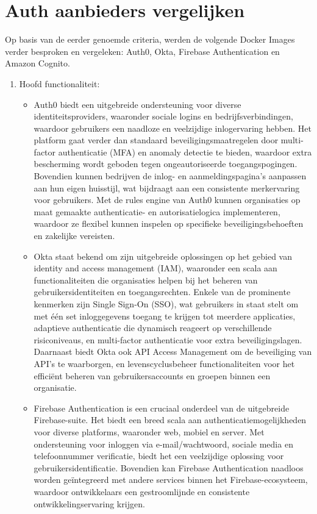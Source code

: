 \section{Auth aanbieders vergelijken}%
\label{sec:auth-aanbieders-vergelijken}
Op basis van de eerder genoemde criteria, werden de volgende Docker Images verder besproken en vergeleken: Auth0, Okta, Firebase Authentication en Amazon Cognito.
\begin{enumerate}
  \item Hoofd functionaliteit:
  \begin{itemize}
    \item Auth0 biedt een uitgebreide ondersteuning voor diverse identiteitsproviders, waaronder sociale logins en bedrijfsverbindingen, waardoor gebruikers een naadloze en veelzijdige inlogervaring hebben. Het platform gaat verder dan standaard beveiligingsmaatregelen door multi-factor authenticatie (MFA) en anomaly detectie te bieden, waardoor extra bescherming wordt geboden tegen ongeautoriseerde toegangspogingen. Bovendien kunnen bedrijven de inlog- en aanmeldingspagina's aanpassen aan hun eigen huisstijl, wat bijdraagt aan een consistente merkervaring voor gebruikers. Met de rules engine van Auth0 kunnen organisaties op maat gemaakte authenticatie- en autorisatielogica implementeren, waardoor ze flexibel kunnen inspelen op specifieke beveiligingsbehoeften en zakelijke vereisten.
    \item Okta staat bekend om zijn uitgebreide oplossingen op het gebied van identity and access management (IAM), waaronder een scala aan functionaliteiten die organisaties helpen bij het beheren van gebruikersidentiteiten en toegangsrechten. Enkele van de prominente kenmerken zijn Single Sign-On (SSO), wat gebruikers in staat stelt om met één set inloggegevens toegang te krijgen tot meerdere applicaties, adaptieve authenticatie die dynamisch reageert op verschillende risiconiveaus, en multi-factor authenticatie voor extra beveiligingslagen. Daarnaast biedt Okta ook API Access Management om de beveiliging van API's te waarborgen, en levenscyclusbeheer functionaliteiten voor het efficiënt beheren van gebruikersaccounts en groepen binnen een organisatie.
    \item Firebase Authentication is een cruciaal onderdeel van de uitgebreide Firebase-suite. Het biedt een breed scala aan authenticatiemogelijkheden voor diverse platforms, waaronder web, mobiel en server. Met ondersteuning voor inloggen via e-mail/wachtwoord, sociale media en telefoonnummer verificatie, biedt het een veelzijdige oplossing voor gebruikersidentificatie. Bovendien kan Firebase Authentication naadloos worden geïntegreerd met andere services binnen het Firebase-ecosysteem, waardoor ontwikkelaars een gestroomlijnde en consistente ontwikkelingservaring krijgen.

\end{itemize}
\end{enumerate}

